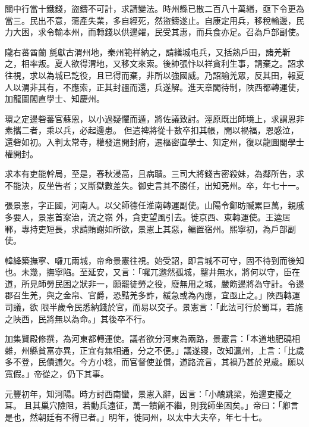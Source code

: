 \begin{pinyinscope}
 關中行當十鐵錢，盜鑄不可計，求請變法。時州縣已散二百八十萬緡，亟下令更為當三。民出不意，蕩產失業，多自經死，然盜鑄遂止。自康定用兵，移稅輸邊，民力大困，求令輸本州，而轉錢以供邊糴，民受其惠，而兵食亦足。召為戶部副使。



 隴右蕃酋蘭
 氈獻古渭州地，秦州範祥納之，請繕城屯兵，又括熟戶田，諸羌靳之，相率叛。夏人欲得渭地，又移文來索。後帥張忭以祥貪利生事，請棄之。詔求往視，求以為城已訖役，且已得而棄，非所以強國威。乃詔諭羌眾，反其田，報夏人以渭非其有，不應索，正其封疆而還，兵遂解。進天章閣待制，陜西都轉運使，加龍圖閣直學士、知慶州。



 環之定邊砦蕃官蘇恩，以小過疑懼而遁，將佐議致討。涇原既出師境上，求謂恩非素攜二者，乘以兵，必起邊患。
 但遣裨將從十數卒扣其帳，開以禍福，恩感泣，還砦如初。入判太常寺，權發遣開封府，遷樞密直學士、知定州，復以龍圖閣學士權開封。



 求本有吏能幹局，至是，春秋浸高，且病聵。三司大將錢吉密殺妹，為鄰所告，求不能決，反坐告者；又斷獄數差失。御史言其不勝任，出知兗州。卒，年七十一。



 張景憲，字正國，河南人。以父師德任淮南轉運副使。山陽令鄭昉贓累巨萬，親戚多要人，景憲首案治，流之嶺
 外，貪吏望風引去。徙京西、東轉運使。王逵居鄆，專持吏短長，求請賄謝如所欲，景憲上其惡，編置宿州。熙寧初，為戶部副使。



 韓絳築撫寧、囉兀兩城，帝命景憲往視。始受詔，即言城不可守，固不待到而後知也。未幾，撫寧陷。至延安，又言：「囉兀邈然孤城，鑿井無水，將何以守，臣在道，所見師勞民困之狀非一，願罷徒勞之役，廢無用之城，嚴飭邊將為守計。令邊郡召生羌，與之金帛、官爵，恐黠羌多詐，緩急或為內應，宜亟止之。」陜西轉運司議，欲
 限半歲令民悉納錢於官，而易以交子。景憲言：「此法可行於蜀耳，若施之陜西，民將無以為命。」其後卒不行。



 加集賢殿修撰，為河東都轉運使。議者欲分河東為兩路，景憲言：「本道地肥磽相雜，州縣貧富亦異，正宜有無相通，分之不便。」議遂寢，改知瀛州，上言：「比歲多不登，民債逋欠。今方小稔，而官督使並償，道路流言，其禍乃甚於兇歲。願以寬假。」帝從之，仍下其事。



 元豐初年，知河陽。時方討西南蠻，景憲入辭，因言：「小醜跳梁，殆邊吏擾之耳。
 且其巢穴險阻，若動兵遠征，萬一饋餉不繼，則我師坐困矣。」帝曰：「卿言是也，然朝廷有不得已者。」明年，徙同州，以太中大夫卒，年七十七。




\end{pinyinscope}
